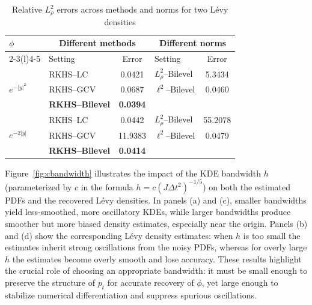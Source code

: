 \documentclass[12pt]{article}
\numberwithin{equation}{section}
\numberwithin{theorem}{section}
\begin{document}
\begin{table}[H]
    \centering
    \caption{Relative $L^2_\rho$ errors across methods and norms for two L\'evy densities}
    \label{tab:KDEerrorNormMerged}
    \begin{tabular}{l l c l c}
        \toprule
        $\phi$ & \multicolumn{2}{c}{Different methods} & \multicolumn{2}{c}{Different norms} \\
        \cmidrule(r){2-3}\cmidrule(l){4-5}
                     & Setting & Error & Setting & Error \\
        \midrule
        \multirow{3}{*}{$e^{-|y|^2}$}
            & RKHS--LC          & 0.0421  & $L^2_{\rho}$--Bilevel & 5.3434 \\
            & RKHS--GCV         & 0.0687  & $\ell^2$--Bilevel     & 0.0460 \\
            & \textbf{RKHS--Bilevel} & \textbf{0.0394} & & \\
        \midrule
        \multirow{3}{*}{$e^{-2|y|}$}
            & RKHS--LC          & 0.0442  & $L^2_{\rho}$--Bilevel & 55.2078 \\
            & RKHS--GCV         & 11.9383 & $\ell^2$--Bilevel     & 0.0479 \\
            & \textbf{RKHS--Bilevel} & \textbf{0.0414} & & \\
        \bottomrule
    \end{tabular}
\end{table}


Figure~\ref{fig:cbandwidth} illustrates the impact of the KDE bandwidth $h$ (parameterized by $c$ in the formula $h=c(J\Delta t^2)^{-1/5}$) on both the estimated PDFs and the recovered L\'evy densities. In panels (a) and (c), smaller bandwidths yield less-smoothed, more oscillatory KDEs, while larger bandwidths produce smoother but more biased density estimates, especially near the origin. Panels (b) and (d) show the corresponding L\'evy density estimates: when $h$ is too small the estimates inherit strong oscillations from the noisy PDFs, whereas for overly large $h$ the estimates become overly smooth and lose accuracy. These results highlight the crucial role of choosing an appropriate bandwidth: it must be small enough to preserve the structure of $p_t$ for accurate recovery of $\phi$, yet large enough to stabilize numerical differentiation and suppress spurious oscillations.
\end{document}
